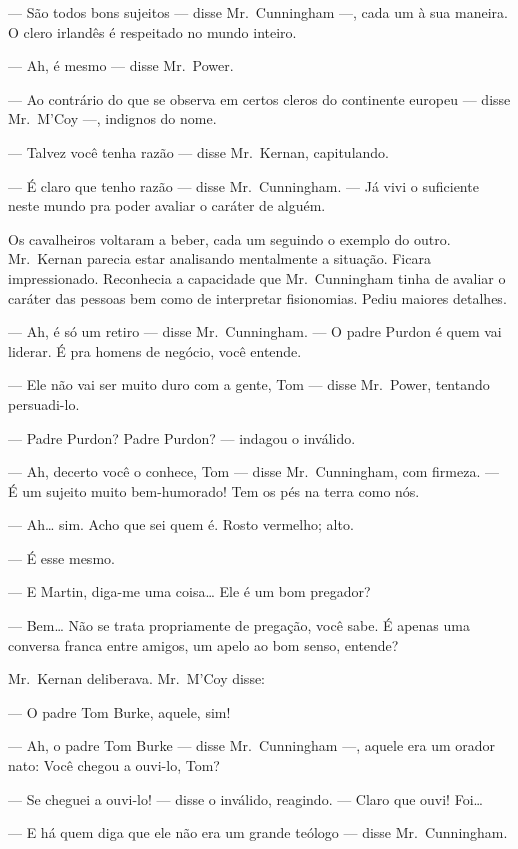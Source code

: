 --- São todos bons sujeitos --- disse Mr.~Cunningham ---, cada um à sua
maneira.  O clero irlandês é respeitado no mundo inteiro.

--- Ah, é mesmo --- disse Mr.~Power.

--- Ao contrário do que se observa em certos cleros do continente europeu ---
disse Mr.~M’Coy ---, indignos do nome.

--- Talvez você tenha razão --- disse Mr.~Kernan, capitulando.

--- É claro que tenho razão --- disse Mr.~Cunningham.  --- Já vivi o suficiente
neste mundo pra poder avaliar o caráter de alguém.

Os cavalheiros voltaram a beber, cada um seguindo o exemplo do outro.  
Mr.~Kernan parecia estar analisando mentalmente a situação.  Ficara impressionado.
Reconhecia a capacidade que Mr.~Cunningham tinha de avaliar o caráter das
pessoas bem como de interpretar fisionomias.  Pediu maiores detalhes.

--- Ah, é só um retiro --- disse Mr.~Cunningham.  --- O padre Purdon é quem vai
liderar.  É pra homens de negócio, você entende.

--- Ele não vai ser muito duro com a gente, Tom --- disse Mr.~Power, tentando
persuadi-lo.

--- Padre Purdon?  Padre Purdon? --- indagou o inválido.

--- Ah, decerto você o conhece, Tom --- disse Mr.~Cunningham, com firmeza.  ---
É um sujeito muito bem-humorado!  Tem os pés na terra como nós.

--- Ah\ldots{} sim.  Acho que sei quem é.  Rosto vermelho; alto.

--- É esse mesmo.

--- E Martin, diga-me uma coisa\ldots{} Ele é um bom pregador?

--- Bem\ldots{} Não se trata propriamente de pregação, você sabe.  É apenas uma
conversa franca entre amigos, um apelo ao bom senso, entende?

Mr.~Kernan deliberava.  Mr.~M’Coy disse:

--- O padre Tom Burke, aquele, sim!

--- Ah, o padre Tom Burke --- disse Mr.~Cunningham ---, aquele era um orador
nato: Você chegou a ouvi-lo, Tom?

--- Se cheguei a ouvi-lo! --- disse o inválido, reagindo.  --- Claro que ouvi!
Foi\ldots{}

--- E há quem diga que ele não era um grande teólogo --- disse Mr.~Cunningham.


